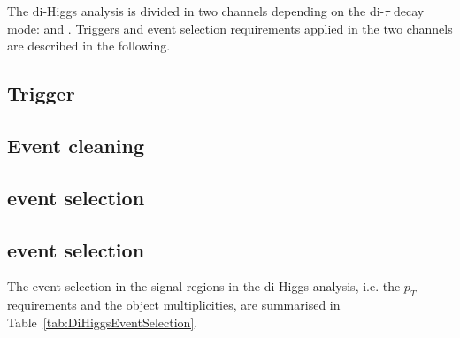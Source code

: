 The di-Higgs analysis is divided in two channels depending on the di-$\tau$ decay mode: \lephad and \hadhad. Triggers and event selection requirements applied in the two channels are described in the following.

\subsection{Trigger}
\label{subsec:trigger}


\subsection{Event cleaning}
\label{subsec:eventcleaning}



\subsection{\lephad event selection}
\label{subsec:selhh_lephad}


\subsection{\hadhad event selection}
\label{subsec:selhh_hadhad}



The event selection in the signal regions in the di-Higgs analysis, i.e. the $p_T$ requirements and the object multiplicities, are summarised in Table~\ref{tab:DiHiggsEventSelection}.


